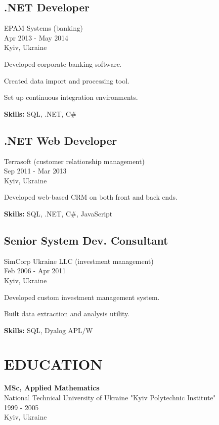 \documentclass[a4paper,10pt]{article}
\begin{document}
\subsection*{.NET Developer}
EPAM Systems (banking) \\
Apr 2013 - May 2014 \\
Kyiv, Ukraine
\begin{bulletlist}
    \item Developed corporate banking software.
    \item Created data import and processing tool.
    \item Set up continuous integration environments.
\end{bulletlist}
\textbf{Skills:} SQL, .NET, C\#

\subsection*{.NET Web Developer}
Terrasoft (customer relationship management) \\
Sep 2011 - Mar 2013 \\
Kyiv, Ukraine
\begin{bulletlist}
    \item Developed web-based CRM on both front and back ends.
\end{bulletlist}
\textbf{Skills:} SQL, .NET, C\#, JavaScript

\subsection*{Senior System Dev. Consultant}
SimCorp Ukraine LLC (investment management) \\
Feb 2006 - Apr 2011 \\
Kyiv, Ukraine
\begin{bulletlist}
    \item Developed custom investment management system.
    \item Built data extraction and analysis utility.
\end{bulletlist}
\textbf{Skills:} SQL, Dyalog APL/W

\section*{EDUCATION}
\textbf{MSc, Applied Mathematics} \\
National Technical University of Ukraine "Kyiv Polytechnic Institute" \\
1999 - 2005 \\
Kyiv, Ukraine
\end{document}
